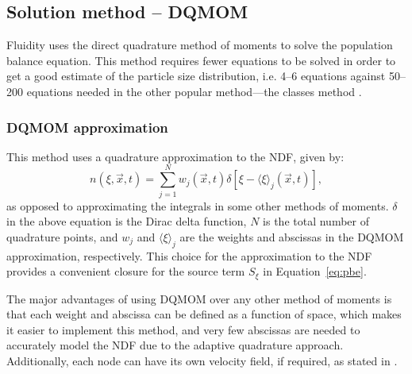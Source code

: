 \subsection{Solution method -- DQMOM}

Fluidity uses the direct quadrature method of moments \citep{marchisio2005solution} to solve the population balance equation.
This method requires fewer equations to be solved in order to get a good estimate of the particle size distribution, i.e. 4--6 equations against 50--200 equations needed in the other popular method---the classes method \citep{marchisio2003quadratureb}. 
\subsubsection{DQMOM approximation}
This method uses a quadrature approximation to the NDF, given by:
\begin{equation}
n \left( \xi, \vec{x}, t \right) = \sum_{j=1}^N w_{j} \left( \vec{x}, t \right) \delta \left[ \xi - \langle \xi \rangle_{j} \left( \vec{x}, t \right) \right],
\label{eq:DQMOM_ndf}
\end{equation}
as opposed to approximating the integrals in some other methods of moments. $\delta$ in the above equation is the Dirac delta function, $N$ is the total number of quadrature points, and $w_j$ and $\langle \xi \rangle_{j}$ are the weights and abscissas in the DQMOM approximation, respectively. This choice for the approximation to the NDF provides a convenient closure for the source term $S_{\xi}$ in Equation~\eqref{eq:pbe}.

The major advantages of using DQMOM over any other method of moments is that each weight and abscissa can be defined as a function of space, which makes it easier to implement this method, and very few abscissas are needed to accurately model the NDF due to the adaptive quadrature approach.
Additionally, each node can have its own velocity field, if required, as stated in \citet{marchisio2005solution}.

